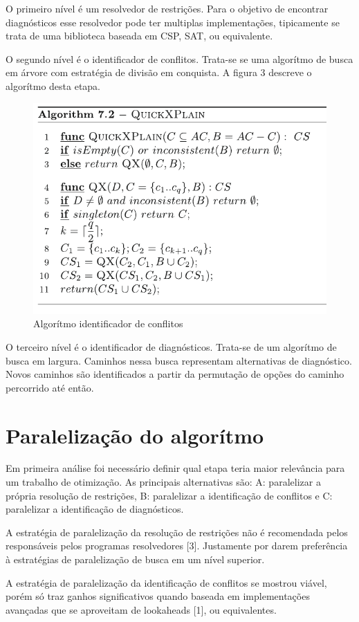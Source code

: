 \documentclass[conference]{IEEEtran}
\begin{document}
O primeiro nível é um resolvedor de restrições. Para o objetivo de encontrar diagnósticos esse resolvedor pode ter multiplas implementações, tipicamente se trata de uma biblioteca baseada em CSP, SAT, ou equivalente.

O segundo nível é o identificador de conflitos. Trata-se se uma algorítmo de busca em árvore com estratégia de divisão em conquista. A figura 3 descreve o algorítmo desta etapa.

\begin{figure}[htbp]
\centerline{\includegraphics[width=0.7\columnwidth]{qx.png}}
\caption{Algorítmo identificador de conflitos} 
\label{fig}
\end{figure}

O terceiro nível é o identificador de diagnósticos. Trata-se de um algorítmo de busca em largura. Caminhos nessa busca representam alternativas de diagnóstico. Novos caminhos são identificados a partir da permutação de opções do caminho percorrido até então.

\section{Paralelização do algorítmo}

Em primeira análise foi necessário definir qual etapa teria maior relevância para um trabalho de otimização. As principais alternativas são: A: paralelizar a própria resolução de restrições, B: paralelizar a identificação de conflitos e C: paralelizar a identificação de diagnósticos. 

A estratégia de paralelização da resolução de restrições não é recomendada pelos responsáveis pelos programas resolvedores [3]. Justamente por darem preferência à estratégias de paralelização de busca em um nível superior.

A estratégia de paralelização da identificação de conflitos se mostrou viável, porém só traz ganhos significativos quando baseada em implementações avançadas que se aproveitam de lookaheads [1], ou equivalentes. 
\end{document}
